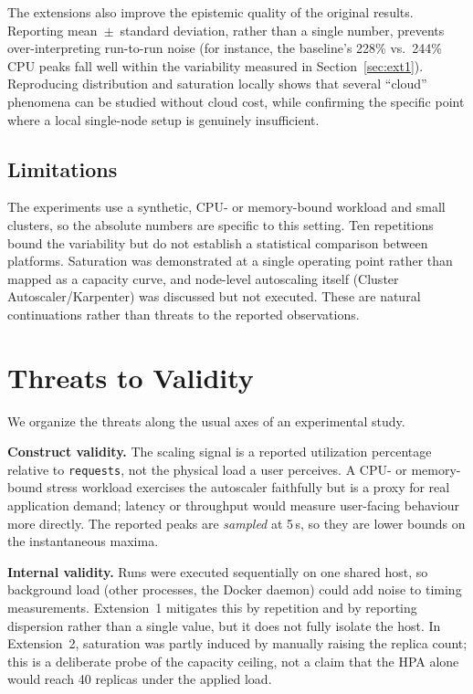\documentclass[conference]{IEEEtran}
\begin{document}
The extensions also improve the epistemic quality of the original results.
Reporting mean~$\pm$~standard deviation, rather than a single number, prevents
over-interpreting run-to-run noise (for instance, the baseline's 228\% vs.\ 244\%
CPU peaks fall well within the variability measured in Section~\ref{sec:ext1}).
Reproducing distribution and saturation locally shows that several ``cloud''
phenomena can be studied without cloud cost, while confirming the specific point
where a local single-node setup is genuinely insufficient.

\subsection{Limitations}
The experiments use a synthetic, CPU- or memory-bound workload and small
clusters, so the absolute numbers are specific to this setting. Ten repetitions
bound the variability but do not establish a statistical comparison between
platforms. Saturation was demonstrated at a single operating point rather than
mapped as a capacity curve, and node-level autoscaling itself (Cluster
Autoscaler/Karpenter) was discussed but not executed. These are natural
continuations rather than threats to the reported observations.

\section{Threats to Validity}
\label{sec:threats}
We organize the threats along the usual axes of an experimental study.

\textbf{Construct validity.} The scaling signal is a reported utilization
percentage relative to \texttt{requests}, not the physical load a user perceives.
A CPU- or memory-bound stress workload exercises the autoscaler faithfully but is
a proxy for real application demand; latency or throughput would measure
user-facing behaviour more directly. The reported peaks are \emph{sampled} at
5\,s, so they are lower bounds on the instantaneous maxima.

\textbf{Internal validity.} Runs were executed sequentially on one shared host, so
background load (other processes, the Docker daemon) could add noise to timing
measurements. Extension~1 mitigates this by repetition and by reporting
dispersion rather than a single value, but it does not fully isolate the host. In
Extension~2, saturation was partly induced by manually raising the replica count;
this is a deliberate probe of the capacity ceiling, not a claim that the HPA alone
would reach 40 replicas under the applied load.
\end{document}
